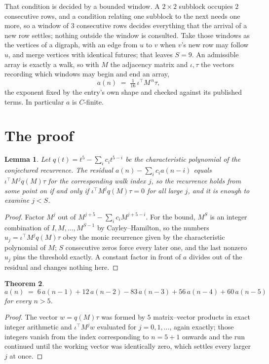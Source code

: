 \documentclass[11pt,a4paper]{article}
\theoremstyle{plain}
\newtheorem{theorem}{Theorem}
\newtheorem{lemma}[theorem]{Lemma}
\theoremstyle{definition}
\begin{document}
That condition is decided by a bounded window. A $2\times2$ subblock occupies $2$ consecutive rows, and a condition relating one subblock to the next needs one more, so a window of $3$ consecutive rows decides everything that the arrival of a new row settles; nothing outside the window is consulted. Take those windows as the vertices of a digraph, with an edge from $u$ to $v$ when $v$'s new row may follow $u$, and merge vertices with identical futures; that leaves $S=9$. An admissible array is exactly a walk, so with $M$ the adjacency matrix and $\iota,\tau$ the vectors recording which windows may begin and end an array,
\[
a(n)\;=\;\tfrac{1}{16}\,\iota^{\!\top}M^{\,n}\tau ,
\]
the exponent fixed by the entry's own shape and checked against its published terms. In
particular $a$ is $C$-finite.

\section{The proof}

\begin{lemma}\label{lem:crit}
Let $q(t)=t^{5}-\sum_i c_it^{5-i}$ be the characteristic polynomial of the
conjectured recurrence. The residual $a(n)-\sum_ic_ia(n-i)$ equals
$\iota^{\!\top}M^{\,j}q(M)\tau$ for the corresponding walk index $j$, so the recurrence
holds from some point on if and only if $\iota^{\!\top}M^{j}q(M)\tau=0$ for all large $j$,
and it is enough to examine $j<S$.
\end{lemma}

\begin{proof}
Factor $M^{j}$ out of $M^{j+5}-\sum_ic_iM^{j+5-i}$. For the bound, $M^{S}$
is an integer combination of $I,M,\dots,M^{S-1}$ by Cayley--Hamilton, so the numbers
$u_j=\iota^{\!\top}M^{j}q(M)\tau$ obey the monic recurrence given by the characteristic
polynomial of $M$; $S$ consecutive zeros force every later one, and the last nonzero $u_j$
pins the threshold exactly. A constant factor in front of $a$ divides out of the residual and
changes nothing here.
\end{proof}

\begin{theorem}
\[
a(n)\;=\;6\,a(n-1) + 12\,a(n-2) - 83\,a(n-3) + 56\,a(n-4) + 60\,a(n-5)
\]
for every $n>5$.
\end{theorem}

\begin{proof}
The vector $w=q(M)\tau$ was formed by $5$ matrix--vector products in exact integer
arithmetic and $\iota^{\!\top}M^{j}w$ evaluated for $j=0,1,\dots$, again exactly; those
integers vanish from the index corresponding to $n=5+1$ onwards and the run continued
until the working vector was identically zero, which settles every larger $j$ at once.
\end{proof}
\end{document}
